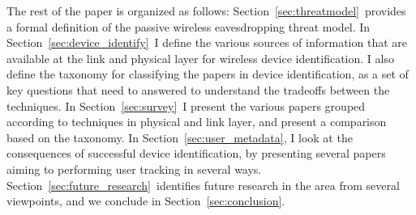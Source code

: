 The rest of the paper is organized as follows: Section~\ref{sec:threatmodel}~provides a formal definition of the passive wireless eavesdropping threat model. 
%
In Section~\ref{sec:device_identify}~I define the various sources of information that are available at the link and physical layer for wireless device identification. 
%
I also define the taxonomy for classifying the papers in device identification, as a set of key questions that need to answered to understand the tradeoffs between the techniques. 
%
In Section~\ref{sec:survey}~I present the various papers grouped according to techniques in physical and link layer, and present a comparison based on the taxonomy. 
%
In Section~\ref{sec:user_metadata}, I look at the consequences of successful device identification, by presenting several papers aiming to performing user tracking in several ways. 
%
Section~\ref{sec:future_research}~identifies future research in the area from several viewpoints, and we conclude in Section~\ref{sec:conclusion}.
